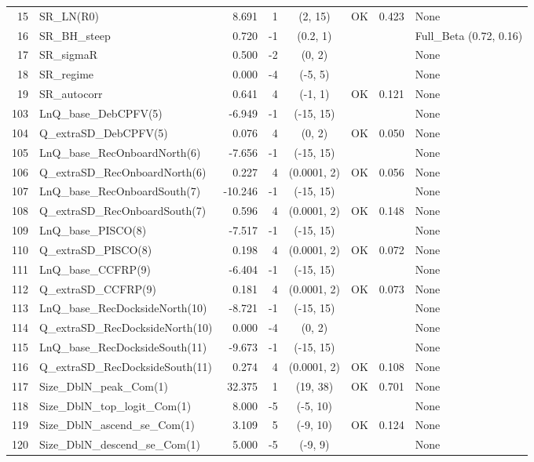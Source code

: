 \documentclass[12pt,]{article}
\begin{document}
\begin{landscape}
\begin{longtable}{rlrrcccp{1.5in}}
  15 & SR\_LN(R0) & 8.691 & 1 & (2, 15) & OK & 0.423 & None \\ 
  16 & SR\_BH\_steep & 0.720 & -1 & (0.2, 1) &  &  & Full\_Beta (0.72, 0.16) \\ 
  17 & SR\_sigmaR & 0.500 & -2 & (0, 2) &  &  & None \\ 
  18 & SR\_regime & 0.000 & -4 & (-5, 5) &  &  & None \\ 
  19 & SR\_autocorr & 0.641 & 4 & (-1, 1) & OK & 0.121 & None \\ 
  103 & LnQ\_base\_DebCPFV(5) & -6.949 & -1 & (-15, 15) &  &  & None \\ 
  104 & Q\_extraSD\_DebCPFV(5) & 0.076 & 4 & (0, 2) & OK & 0.050 & None \\ 
  105 & LnQ\_base\_RecOnboardNorth(6) & -7.656 & -1 & (-15, 15) &  &  & None \\ 
  106 & Q\_extraSD\_RecOnboardNorth(6) & 0.227 & 4 & (0.0001, 2) & OK & 0.056 & None \\ 
  107 & LnQ\_base\_RecOnboardSouth(7) & -10.246 & -1 & (-15, 15) &  &  & None \\ 
  108 & Q\_extraSD\_RecOnboardSouth(7) & 0.596 & 4 & (0.0001, 2) & OK & 0.148 & None \\ 
  109 & LnQ\_base\_PISCO(8) & -7.517 & -1 & (-15, 15) &  &  & None \\ 
  110 & Q\_extraSD\_PISCO(8) & 0.198 & 4 & (0.0001, 2) & OK & 0.072 & None \\ 
  111 & LnQ\_base\_CCFRP(9) & -6.404 & -1 & (-15, 15) &  &  & None \\ 
  112 & Q\_extraSD\_CCFRP(9) & 0.181 & 4 & (0.0001, 2) & OK & 0.073 & None \\ 
  113 & LnQ\_base\_RecDocksideNorth(10) & -8.721 & -1 & (-15, 15) &  &  & None \\ 
  114 & Q\_extraSD\_RecDocksideNorth(10) & 0.000 & -4 & (0, 2) &  &  & None \\ 
  115 & LnQ\_base\_RecDocksideSouth(11) & -9.673 & -1 & (-15, 15) &  &  & None \\ 
  116 & Q\_extraSD\_RecDocksideSouth(11) & 0.274 & 4 & (0.0001, 2) & OK & 0.108 & None \\ 
  117 & Size\_DblN\_peak\_Com(1) & 32.375 & 1 & (19, 38) & OK & 0.701 & None \\ 
  118 & Size\_DblN\_top\_logit\_Com(1) & 8.000 & -5 & (-5, 10) &  &  & None \\ 
  119 & Size\_DblN\_ascend\_se\_Com(1) & 3.109 & 5 & (-9, 10) & OK & 0.124 & None \\ 
  120 & Size\_DblN\_descend\_se\_Com(1) & 5.000 & -5 & (-9, 9) &  &  & None \\ 

\end{longtable}
\end{landscape}
\end{document}

